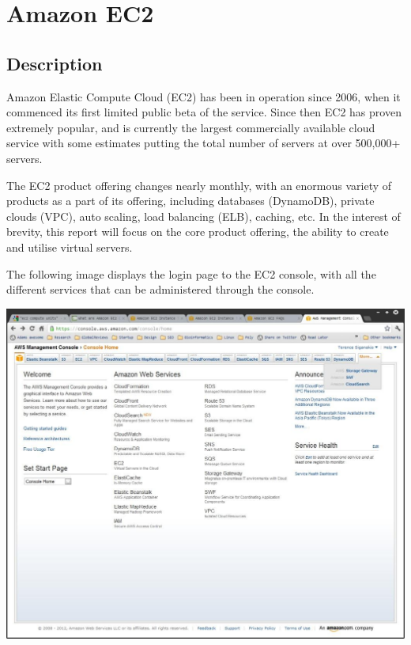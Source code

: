 \chapter{Amazon EC2}
\section{Description}
Amazon Elastic Compute Cloud (EC2) has been in operation since 2006\ftAmOne, when it commenced its first limited public beta of the service. Since then EC2 has proven extremely popular, and is currently the largest commercially available cloud service with some estimates putting the total number of servers at over 500,000+ servers\ftAmTwo.\ftAmOneText\ftAmTwoText

The EC2 product offering changes nearly monthly, with an enormous variety of products as a part of its offering, including databases (DynamoDB), private clouds (VPC), auto scaling, load balancing (ELB), caching, etc. In the interest of brevity, this report will focus on the core product offering, the ability to create and utilise virtual servers.

The following image displays the login page to the EC2 console, with all the different services that can be administered through the console.

\begin{center}
\includegraphics[scale=0.3]{figs/EC2console.jpg}
\end{center}

